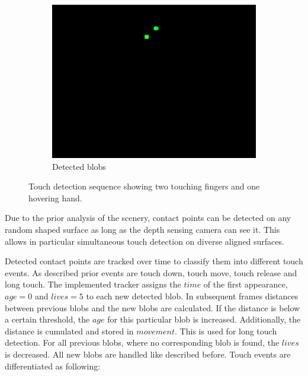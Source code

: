 \begin{figure}[htb]
        \hfill
         \begin{subfigure}[b]{0.31\textwidth}
                \includegraphics[width=\textwidth]{images/software/no_touch/blobs.jpg}
                \caption{Detected blobs}
                \label{img:blobdetectT}
        \end{subfigure}
        \caption{Touch detection sequence showing two touching fingers and one hovering hand.}
        \label{img:calcGT}
\end{figure}
Due to the prior analysis of the scenery, contact points can be detected on any random shaped surface as long as the depth sensing camera can see it. This allows in particular simultaneous touch detection on diverse aligned surfaces. 

Detected contact points are tracked over time to classify them into different touch events. As described prior events are touch down, touch move, touch release and long touch. The implemented tracker assigns the $\mathit{time}$
of the first appearance, $\mathit{age}=0$  and $\mathit{lives} = 5$ to each new detected blob. In subsequent frames distances between previous blobs and the new blobs are calculated. If the distance is below a certain threshold, the $\mathit{age}$ for this particular blob is increased. Additionally, the distance is cumulated and stored in $\mathit{movement}$. This is used for long touch detection.  
For all previous blobs, where no corresponding blob is found, the $\mathit{lives}$ is decreased. All new blobs are handled like described before. Touch events are differentiated as following: 

